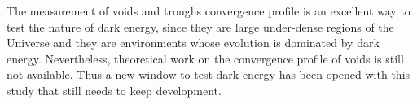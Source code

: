 The measurement of voids and troughs convergence profile is an excellent way to test the nature of dark energy, since they are large under-dense regions of the Universe and they are environments whose evolution is dominated by dark energy. Nevertheless, theoretical work on the convergence profile of voids is still not available. Thus a new window to test dark energy has been opened with this study that still needs to keep development.